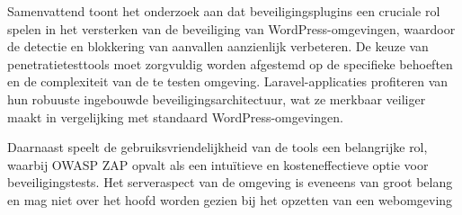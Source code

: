   Samenvattend toont het onderzoek aan dat beveiligingsplugins een cruciale rol spelen in het versterken van de 
  beveiliging van WordPress-omgevingen, waardoor de detectie en blokkering van aanvallen aanzienlijk verbeteren. De keuze 
  van penetratietesttools moet zorgvuldig worden afgestemd op de specifieke behoeften en de complexiteit van de te testen 
  omgeving. Laravel-applicaties profiteren van hun robuuste ingebouwde beveiligingsarchitectuur, wat ze merkbaar veiliger 
  maakt in vergelijking met standaard WordPress-omgevingen.

  Daarnaast speelt de gebruiksvriendelijkheid van de tools een belangrijke rol, waarbij OWASP ZAP opvalt als een intuïtieve 
  en kosteneffectieve optie voor beveiligingstests. Het serveraspect van de omgeving is eveneens van groot belang en mag niet 
  over het hoofd worden gezien bij het opzetten van een webomgeving
